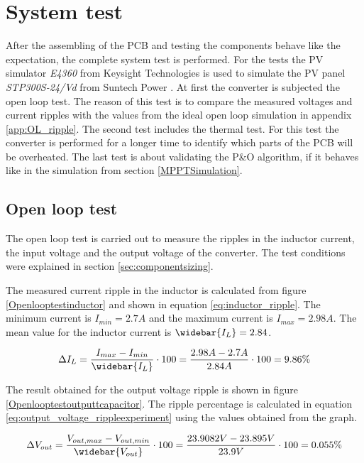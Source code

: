 \section{System test}
After the assembling of the PCB and testing the components behave like the expectation, the complete system test is performed. For the tests the PV simulator \textit{E4360} from Keysight Technologies \cite{PV_simulator} is used to simulate the PV panel \textit{STP300S-24/Vd} from Suntech Power \cite{PV_panel}. At first the converter is subjected the open loop test. The reason of this test is to compare the measured voltages and current ripples with the values from the ideal open loop simulation in appendix \ref{app:OL_ripple}. The second test includes the thermal test. For this test the converter is performed for a longer time to identify which parts of the PCB will be overheated. The last test is about validating the P\&O algorithm, if it behaves like in the simulation from section \ref{MPPTSimulation}.

\subsection{Open loop test}

The open loop test is carried out to measure the ripples in the inductor current, the input voltage and the output voltage of the converter. The test conditions were explained in section \ref{sec:componentsizing}.  

The measured current ripple in the inductor is calculated from figure \ref{Openlooptestinductor} and shown in equation \ref{eq:inductor_ripple}. The minimum current is $I_{min} = 2.7A$ and the maximum current is $I_{max} = 2.98A$. The mean value for the inductor current is $\widebar{I_L}= 2.84$. 

\begin{equation} \label{eq:inductor_rippleexpirment}
\Delta I_L = \frac{I_{max}-I_{min}}{\widebar{I_L}} \cdot 100 = \frac{2.98A-2.7A}{2.84A} \cdot 100 = 9.86\%
\end{equation}

The result obtained for the output voltage ripple is shown in figure \ref{Openlooptestoutputtcapacitor}. The ripple percentage is calculated in equation \ref{eq:output_voltage_rippleexperiment} using the values obtained from the graph. 

\begin{equation} \label{eq:output_voltage_rippleexperiment}
\Delta V_{out} = \frac{V_{out,max}-V_{out,min}}{\widebar{V_{out}}} \cdot 100 = \frac{23.9082V - 23.895V }{23.9V} \cdot 100 = 0.055\%
\end{equation}




